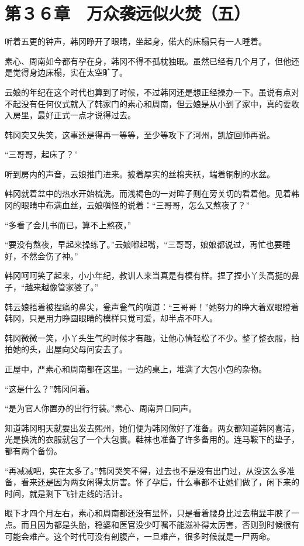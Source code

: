 \section{第３６章　万众袭远似火焚（五）}

听着五更的钟声，韩冈睁开了眼睛，坐起身，偌大的床榻只有一人睡着。

素心、周南如今都有孕在身，韩冈不得不孤枕独眠。虽然已经有几个月了，但他还是觉得身边床榻，实在太空旷了。

云娘的年纪在这个时代也算到了时候，不过韩冈还是想正经操办一下。虽说有点对不起没有任何仪式就入了韩家门的素心和周南，但云娘是从小到了家中，真的要收入房里，最好正式一点才说得过去。

韩冈突又失笑，这事还是得再一等等，至少等攻下了河州，凯旋回师再说。

“三哥哥，起床了？”

听到房内的声音，云娘推门进来。披着厚实的丝棉夹袄，端着铜制的水盆。

韩冈就着盆中的热水开始梳洗。而浅褐色的一对眸子则在旁关切的看着他。见着韩冈的眼睛中布满血丝，云娘嗔怪的说着：“三哥哥，怎么又熬夜了？”

“多看了会儿书而已，算不上熬夜，”

“要没有熬夜，早起来操练了。”云娘嘟起嘴，“三哥哥，娘娘都说过，再忙也要睡好，不然会伤了神。”

韩冈呵呵笑了起来，小小年纪，教训人来当真是有模有样。捏了捏小丫头高挺的鼻子，“越来越像管家婆了。”

韩云娘捂着被捏痛的鼻尖，瓮声瓮气的嗔道：“三哥哥！”她努力的睁大着双眼瞪着韩冈，只是用力睁圆眼睛的模样只觉可爱，却半点不吓人。

韩冈微微一笑，小丫头生气的时候才有趣，让他心情轻松了不少。整了整衣服，拍拍她的头，出屋向父母问安去了。

正屋中，严素心和周南都在这里。一边的桌上，堆满了大包小包的杂物。

“这是什么？”韩冈问着。

“是为官人你置办的出行行装。”素心、周南异口同声。

知道韩冈明天就要出发去熙州，她们便为韩冈做好了准备。两女都知道韩冈喜洁，光是换洗的衣服就包了一个大包裹。鞋袜也准备了许多备用的。连马鞍下的垫子，都有两个备份。

“再减减吧，实在太多了。”韩冈哭笑不得，过去也不是没有出门过，从没这么多准备，看来还是因为两女闲得太厉害。怀了孕后，什么事都不让她们做了，闲下来的时间，就是剩下飞针走线的活计。

眼下才四个月左右，素心和周南都还没有显怀，只是看着腰身比过去稍显丰腴了一点。而且因为都是头胎，稳婆和医官没少叮嘱不能滋补得太厉害，否则到时候很有可能会难产。这个时代可没有剖腹产，一旦难产，很多时候就是一尸两命。

